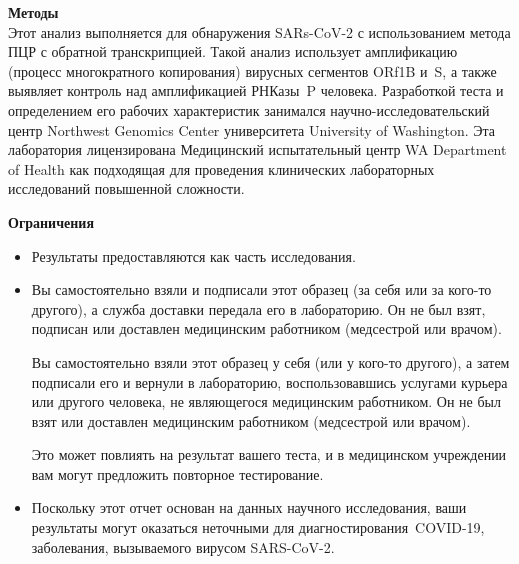 \documentclass[10pt]{article}
\begin{document}
\textbf{Методы}\\
Этот анализ выполняется для обнаружения SARs-CoV-2 с использованием метода ПЦР с
обратной транскрипцией. Такой анализ использует амплификацию (процесс
многократного копирования) вирусных сегментов ORf1B и S, а также выявляет
контроль над амплификацией РНКазы P человека. Разработкой теста и определением
его рабочих характеристик занимался научно-исследовательский центр Northwest
Genomics Center университета University of Washington. Эта лаборатория
лицензирована Медицинский испытательный центр WA Department of Health как
подходящая для проведения клинических лабораторных исследований повышенной
сложности.

\textbf{Ограничения}

\begin{itemize}

\item

  Результаты предоставляются как часть исследования.

\item
  Вы самостоятельно взяли и подписали этот образец (за себя или за кого-то
  другого), а служба доставки передала его в лабораторию. Он не был взят,
  подписан или доставлен медицинским работником (медсестрой или врачом).

  Вы самостоятельно взяли этот образец у себя (или у кого-то другого), а затем
  подписали его и вернули в лабораторию, воспользовавшись услугами курьера или
  другого человека, не являющегося медицинским работником. Он не был взят или
  доставлен медицинским работником (медсестрой или врачом). 



  Это может повлиять на результат вашего теста, и в медицинском учреждении вам
  могут предложить повторное тестирование.

\item

  Поскольку этот отчет основан на данных научного исследования, ваши результаты
  могут оказаться неточными для диагностирования COVID-19, заболевания,
  вызываемого вирусом SARS-CoV-2.

\end{itemize}
\end{document}
